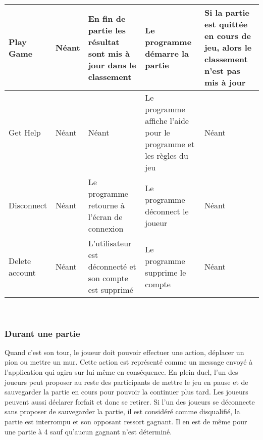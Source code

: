 \documentclass[french, utf8]{article}
\begin{document}
\newpage
\begin{center}
\begin{tabular}{|m{3cm}|m{3cm}|m{3cm}|m{3cm}|m{3cm}|}

\hline Play Game & Néant & En fin de partie les résultat sont mis à jour dans le classement & Le programme démarre la partie & Si la partie est quittée en cours de jeu, alors le classement n'est pas mis à jour \\
\hline Get Help & Néant & Néant & Le programme affiche l'aide pour le programme et les règles du jeu & Néant \\
\hline Disconnect  & Néant & Le programme retourne à l'écran de connexion & Le programme déconnect le joueur & Néant \\
\hline Delete account  & Néant & L'utilisateur est déconnecté et son compte est supprimé & Le programme supprime le compte & Néant \\
\hline
\end{tabular}\\
\end{center}

\subsubsection{Durant une partie}
Quand c'est son tour, le joueur doit pouvoir effectuer une action, déplacer un pion ou mettre un mur. Cette action est représenté comme un message envoyé à l'application qui agira sur lui même en conséquence.
En plein duel, l'un des joueurs peut proposer au reste des participants de mettre le jeu en pause et de sauvegarder la partie en cours pour pouvoir la continuer plus tard. Les joueurs peuvent aussi déclarer forfait et donc se retirer. \newline
Si l'un des joueurs se déconnecte sans proposer de sauvegarder la partie, il est considéré comme disqualifié, la partie est interrompu et son opposant ressort gagnant. Il en est de même pour une partie à 4 sauf qu'aucun gagnant n'est déterminé.

\newline
\end{document}
